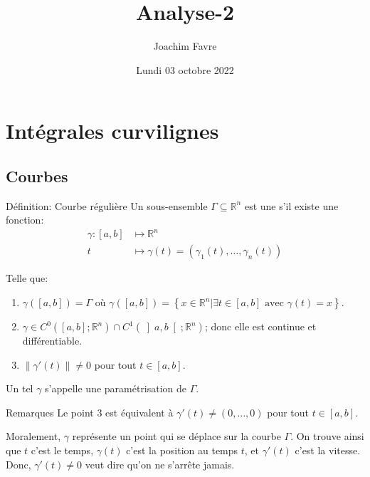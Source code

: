 \documentclass[a4paper]{article}
\title{Analyse-2}
\author{Joachim Favre}
\date{Lundi 03 octobre 2022}
\begin{document}
\maketitle


\section{Intégrales curvilignes}
\subsection{Courbes}
\begin{parag}{Définition: Courbe régulière}
    Un sous-ensemble $\Gamma \subseteq \mathbb{R}^n$ est une  s'il existe une fonction:
    \[\begin{split}
    \gamma: \left[a, b\right] &\longmapsto \mathbb{R}^n \\
    t &\longmapsto \gamma\left(t\right) = \left(\gamma_1\left(t\right), \ldots, \gamma_n\left(t\right)\right)
    \end{split}\]
    
    Telle que:
    \begin{enumerate}
        \item $\gamma\left(\left[a, b\right]\right) = \Gamma$ où $\gamma\left(\left[a, b\right]\right) = \left\{x \in \mathbb{R}^n |  \exists t \in \left[a, b\right] \text{ avec } \gamma\left(t\right) = x\right\}$.
        \item $\gamma \in C^0\left(\left[a, b\right]; \mathbb{R}^n\right) \cap C^1\left(\left]a, b\right[ ; \mathbb{R}^n\right)$; donc elle est continue et différentiable.
        \item $\left\|\gamma'\left(t\right)\right\| \neq 0$ pour tout $t \in \left[a, b\right]$.
    \end{enumerate}
    
    Un tel $\gamma$ s'appelle une paramétrisation de $\Gamma$.
    
    \begin{subparag}{Remarques}
        Le point 3 est équivalent à $\gamma'\left(t\right) \neq \left(0, \ldots, 0\right)$ pour tout $t \in \left[a, b\right]$.

        Moralement, $\gamma$ représente un point qui se déplace sur la courbe $\Gamma$. On trouve ainsi que $t$ c'est le temps, $\gamma\left(t\right)$ c'est la position au temps $t$, et $\gamma'\left(t\right)$ c'est la vitesse. Donc, $\gamma'\left(t\right) \neq 0$ veut dire qu'on ne s'arrête jamais.
    \end{subparag}
\end{parag}
\end{document}
